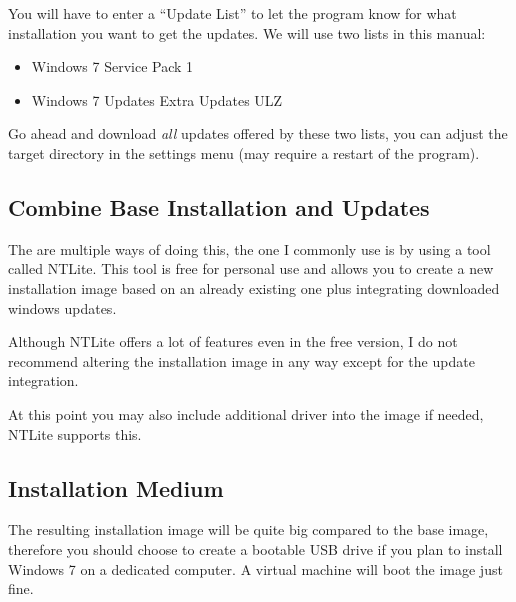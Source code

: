 \documentclass{itsarticle}
\begin{document}

You will have to enter a ``Update List'' to let the program know for what
installation you want to get the updates. We will use two lists in this manual:

\begin{itemize}
    \item Windows 7 Service Pack 1\footnotemark
    \item Windows 7 Updates Extra Updates ULZ\footnotemark
\end{itemize}


Go ahead and download \emph{all} updates offered by these two lists, you can
adjust the target directory in the settings menu (may require a restart of the
program).

\subsection{Combine Base Installation and Updates}
\label{ssec:ntlite}

The are multiple ways of doing this, the one I commonly use is by using a tool
called NTLite\footnotemark. This tool is free for personal use and allows you
to create a new installation image based on an already existing one plus
integrating downloaded windows updates.



Although NTLite offers a lot of features even in the free version, I do not
recommend altering the installation image in any way except for the update
integration.

At this point you may also include additional driver into the image if needed,
NTLite supports this.

\subsection{Installation Medium}
\label{ssec:medium}

The resulting installation image will be quite big compared to the base image,
therefore you should choose to create a bootable USB drive if you plan to
install Windows 7 on a dedicated computer. A virtual machine will boot the
image just fine.
\end{document}
